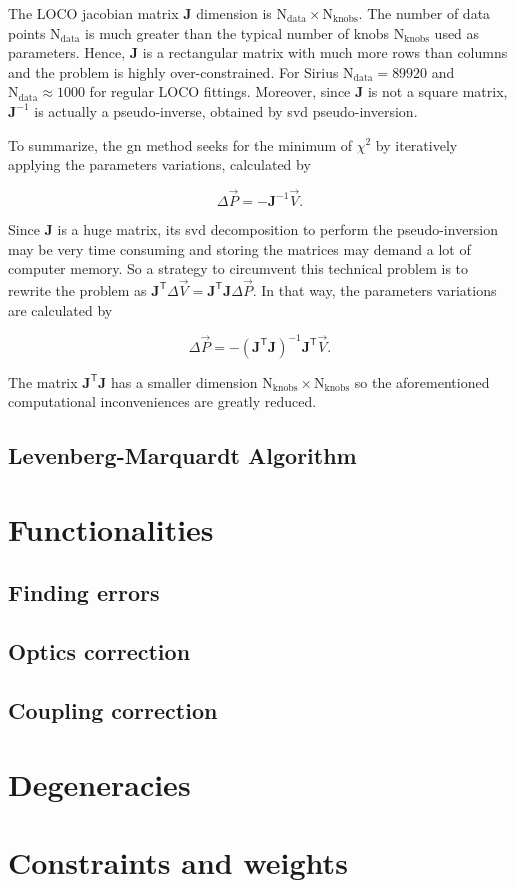 The LOCO jacobian matrix $\mathbf{J}$ dimension is $\mathrm{N}_{\mathrm{data}} \times \mathrm{N}_{\mathrm{knobs}}$. The number of data points $\mathrm{N}_{\mathrm{data}}$ is much greater than the typical number of knobs $\mathrm{N}_{\mathrm{knobs}}$ used as parameters. Hence, $\mathbf{J}$ is a rectangular matrix with much more rows than columns and the problem is highly over-constrained. For Sirius $\mathrm{N}_{\mathrm{data}} = 89920$ and $\mathrm{N}_{\mathrm{data}} \approx 1000$ for regular LOCO fittings. Moreover, since $\mathbf{J}$ is not a square matrix, $\mathbf{J}^{-1}$ is actually a pseudo-inverse, obtained by \gls{svd} pseudo-inversion.

To summarize, the \gls{gn} method seeks for the minimum of $\chi^2$ by iteratively applying the parameters variations, calculated by

\begin{equation}
    \Delta \vec{P} = - \mathbf{J}^{-1} \vec{V}.
\end{equation}

Since $\mathbf{J}$ is a huge matrix, its \gls{svd} decomposition to perform the pseudo-inversion may be very time consuming and storing the matrices may demand a lot of computer memory. So a strategy to 
circumvent this technical problem is to rewrite the problem as $\mathbf{J}^{\mathsf{T}}\Delta \vec{V} = \mathbf{J}^{\mathsf{T}}\mathbf{J}\Delta \vec{P}$. In that way, the parameters variations are calculated by

\begin{equation}
    \Delta \vec{P} = - \left(\mathbf{J}^{\mathsf{T}} \mathbf{J}\right)^{-1}\mathbf{J}^{\mathsf{T}} \vec{V}.
\end{equation}

The matrix $\mathbf{J}^{\mathsf{T}} \mathbf{J}$ has a smaller dimension $\mathrm{N}_{\mathrm{knobs}} \times \mathrm{N}_{\mathrm{knobs}}$ so the aforementioned computational 
inconveniences are greatly reduced.

\subsection{Levenberg-Marquardt Algorithm}
\section{Functionalities}
\subsection{Finding errors}
\subsection{Optics correction}
\subsection{Coupling correction}

\section{Degeneracies}

\section{Constraints and weights}

